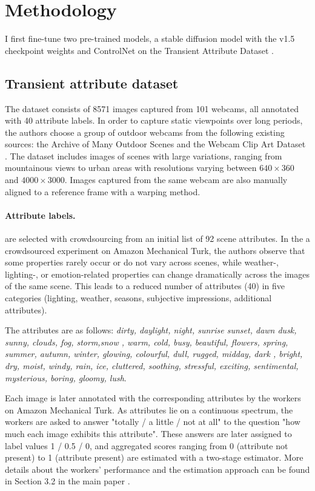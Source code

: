 \section{Methodology}
I first fine-tune two pre-trained models,  a stable diffusion model with the v1.5 checkpoint weights \cite{rombach2022high} and ControlNet \cite{zhang2023adding} on the Transient Attribute Dataset \cite{laffont2014transient}. 

\subsection{Transient attribute dataset} 

The dataset consists of  8571 images captured from 101 webcams, all annotated with 40 attribute labels. In order to capture static viewpoints over long periods, the authors choose a group of outdoor webcams from the following existing sources: the Archive of Many Outdoor Scenes \cite{jacobs2007consistent} and the Webcam Clip Art Dataset \cite{lalonde2009webcam}. The dataset includes images of scenes with large variations, ranging from  mountainous views to urban areas with resolutions varying between $640 \times 360$ and $4000 \times 3000$. Images captured from the same webcam are also manually aligned to a reference frame with a warping method.
\paragraph{Attribute labels.} are selected with crowdsourcing from an initial list of 92 scene attributes. In the a crowdsourced experiment on Amazon Mechanical Turk, the authors observe that some properties rarely occur or do not vary across scenes, while weather-, lighting-, or emotion-related properties can change dramatically across the images of the same scene. This leads  to a reduced number of attributes (40) in five categories (lighting, weather, seasons, subjective impressions, additional attributes).

The attributes are as follows: \textit{dirty, daylight, night, sunrise sunset, dawn dusk, sunny, clouds, fog, storm,snow
, warm, cold, busy, beautiful, flowers, spring, summer, autumn, winter, glowing, colourful, dull, rugged, midday, dark
, bright, dry, moist, windy, rain, ice, cluttered, soothing, stressful, exciting, sentimental, mysterious, boring, gloomy, lush}.

Each image is later annotated with the corresponding attributes by the workers on Amazon Mechanical Turk. As attributes lie on a continuous spectrum, the workers are asked to answer "totally / a little / not at all" to the question "how much each image exhibits this attribute". These answers are later assigned to label values 1 / 0.5 / 0, and aggregated scores ranging from 0 (attribute not present) to 1 (attribute present) are estimated with a two-stage estimator. More details about the workers' performance and the estimation approach can be found in Section 3.2 in the main paper \cite{laffont2014transient}.

